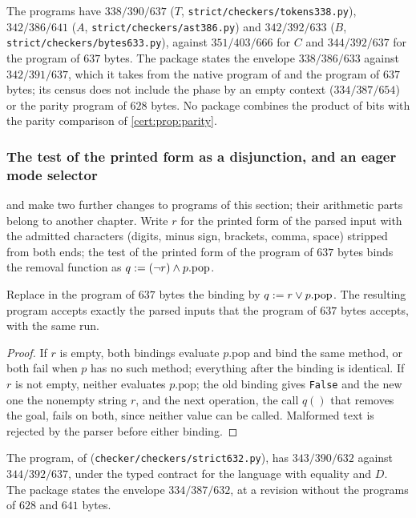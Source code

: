 The programs have $338/390/637$ ($T$, \texttt{strict/checkers/tokens338.py}),
$342/386/641$ ($A$, \texttt{strict/checkers/ast386.py}) and $342/392/633$
($B$, \texttt{strict/checkers/bytes633.py}), against $351/403/666$ for $C$ and
$344/392/637$ for the program of $637$ bytes. The package states the envelope
$338/386/633$ against $342/391/637$, which it takes from the native program of
 and the program of $637$ bytes; its census does not include
the phase by an empty context ($334/387/654$) or the parity program of
$628$ bytes. No package combines the product of bits with the parity
comparison of \cref{cert:prop:parity}.

\subsubsection*{The test of the printed form as a disjunction, and an eager mode selector}

 and  make two further changes
to programs of this section; their arithmetic parts belong to another chapter.
Write $r$ for the printed form of the parsed input with the admitted
characters (digits, minus sign, brackets, comma, space) stripped from both
ends; the test of the printed form of the program of $637$ bytes binds the
removal function as $q\mathrel{:=}(\neg r)\land p.\mathrm{pop}$.

\begin{proposition}\label{cert:prop:gate-or}
Replace in the program of $637$ bytes the binding by $q\mathrel{:=} r\lor
p.\mathrm{pop}$. The resulting program accepts exactly the parsed inputs that
the program of $637$ bytes accepts, with the same run.
\end{proposition}
\begin{proof}
If $r$ is empty, both bindings evaluate $p.\mathrm{pop}$ and bind the same
method, or both fail when $p$ has no such method; everything after the binding
is identical. If $r$ is not empty, neither evaluates $p.\mathrm{pop}$; the old
binding gives \texttt{False} and the new one the nonempty string $r$, and the
next operation, the call $q()$ that removes the goal, fails on both, since
neither value can be called. Malformed text is rejected by the parser before
either binding.
\end{proof}

The program, of  (\texttt{checker/checkers/strict632.py}),
has $343/390/632$ against $344/392/637$, under the typed contract for the
language with equality and $D$. The package states the envelope $334/387/632$,
at a revision without the programs of $628$ and $641$ bytes.

